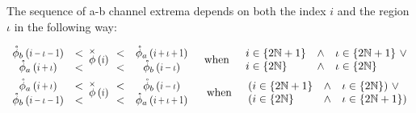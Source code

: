 The sequence of a-b channel extrema depends on both the index $i$ and the region $\iota$ in the following way:

\begin{align*}\label{eq:extremaBounds}
\begin{array}{cc}
  \extremaTheta{b}{i-\iota-1} & < \\
  \extremaTheta{a} {i+\iota} & < 
\end{array}
&\thetaX{i}
\begin{array}{cc}
  < &  \extremaTheta{a}{i+\iota+1}  \\
  < & \extremaTheta{b}{i-\iota}  
\end{array} & \text{when} \quad 
\begin{array}{lcl}
i \in \{2 \mathbb{N}+1\}  & \land & \iota \in \{2 \mathbb{N}+1\} \  \lor \\ 
i \in \{2 \mathbb{N}     \} &  \land & \iota \in \{2 \mathbb{N}    \} \\
 \end{array}  \\
\begin{array}{cc}
  \extremaTheta{a}{i+\iota} & < \\
  \extremaTheta{b} {i-\iota-1} & < 
\end{array}
&\thetaX{i}
\begin{array}{cc}
  < & \extremaTheta{b}{i-\iota}  \\
  < & \extremaTheta{a}{i+\iota+1}  
\end{array} & 
\text{when} \quad 
\begin{array}{lcl}
 (i\in \{2 \mathbb{N}+1\} & \land & \iota \in \{2 \mathbb{N}    \}) \ \lor \\
 (i\in \{2 \mathbb{N}    \} & \land & \iota \in \{2 \mathbb{N}+1\})
 \end{array} 
\end{align*}

